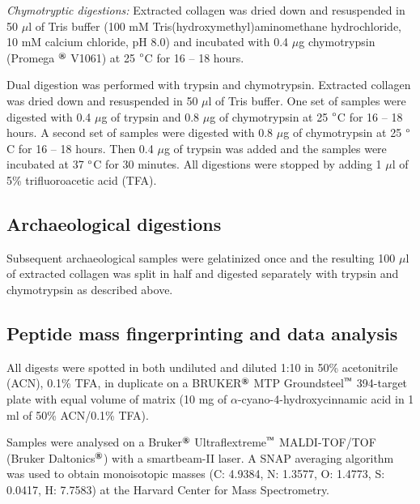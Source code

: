 \documentclass[preprint, 3p, authoryear]{elsarticle} %
\begin{document}
\emph{Chymotryptic digestions:} Extracted collagen was dried down and resuspended in 50 \(\mu\)l of Tris buffer (100 mM Tris(hydroxymethyl)aminomethane hydrochloride, 10 mM calcium chloride, pH 8.0) and incubated with 0.4 \(\mu\)g chymotrypsin (Promega \(^\text{\textregistered}\) V1061) at 25 \(\text{\textdegree}\)C for 16 -- 18 hours.

Dual digestion was performed with trypsin and chymotrypsin. Extracted collagen was dried down and resuspended in 50 \(\mu\)l of Tris buffer. One set of samples were digested with 0.4 \(\mu\)g of trypsin and 0.8 \(\mu\)g of chymotrypsin at 25 \(\text{\textdegree}\)C for 16 -- 18 hours. A second set of samples were digested with 0.8 \(\mu\)g of chymotrypsin at 25 \(\text{\textdegree}\)C for 16 -- 18 hours. Then 0.4 \(\mu\)g of trypsin was added and the samples were incubated at 37 \(\text{\textdegree}\)C for 30 minutes. All digestions were stopped by adding 1 \(\mu\)l of 5\% trifluoroacetic acid (TFA).

\hypertarget{archaeological-digestions}{%
\subsection{Archaeological digestions}\label{archaeological-digestions}}

Subsequent archaeological samples were gelatinized once and the resulting 100 \(\mu\)l of extracted collagen was split in half and digested separately with trypsin and chymotrypsin as described above.

\hypertarget{peptide-mass-fingerprinting-and-data-analysis}{%
\subsection{Peptide mass fingerprinting and data analysis}\label{peptide-mass-fingerprinting-and-data-analysis}}

All digests were spotted in both undiluted and diluted 1:10 in 50\% acetonitrile (ACN), 0.1\% TFA, in duplicate on a BRUKER\(^\text{\textregistered}\) MTP Groundsteel\(^\text{\texttrademark}\) 394-target plate with equal volume of matrix (10 mg of \(\alpha\)-cyano-4-hydroxycinnamic acid in 1 ml of 50\% ACN/0.1\% TFA).

Samples were analysed on a Bruker\(^\text{\textregistered}\) Ultraflextreme\(^\text{\texttrademark}\) MALDI-TOF/TOF (Bruker Daltonics\(^\text{\textregistered}\)) with a smartbeam-II laser. A SNAP averaging algorithm was used to obtain monoisotopic masses (C: 4.9384, N: 1.3577, O: 1.4773, S: 0.0417, H: 7.7583) at the Harvard Center for Mass Spectrometry.
\end{document}
